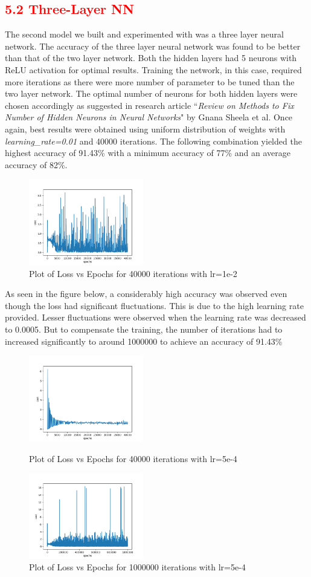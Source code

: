 \documentclass[a4paper,10pt,twocolumn]{article}
\begin{document}
\subsection*{\textcolor{red}{5.2 Three-Layer NN}}
The second model we built and experimented with was a three layer neural network. The accuracy of the three layer neural network was found to be better than that of the two layer network. Both the hidden layers had 5 neurons with ReLU activation for optimal results. Training the network, in this case, required more iterations as there were more number of parameter to be tuned than the two layer network. The optimal number of neurons for both hidden layers were chosen accordingly as suggested in research article ``\emph{Review on Methods to Fix Number of Hidden
Neurons in Neural Networks}" by Gnana Sheela et al. Once again, best results were obtained using uniform distribution of weights with \textit{learning\_rate=0.01} and 40000 iterations. The following combination yielded the highest accuracy of 91.43\% with a minimum accuracy of 77\% and an average accuracy of 82\%.
\begin{figure}[h]
\centering
\includegraphics[scale=1.0, width=5cm]{Fig21.png}
\caption{Plot of Loss vs Epochs for 40000 iterations with lr=1e-2}
\end{figure}
As seen in the figure below, a considerably high accuracy was observed even though the loss had significant fluctuations. This is due to the high learning rate provided. Lesser fluctuations were observed when the learning rate was decreased to 0.0005. But to compensate the training, the number of iterations had to increased significantly to around 1000000 to achieve an accuracy of 91.43\%
\begin{figure}[h]
\centering
\includegraphics[scale=1.0, width=5cm]{Fig22.png}
\caption{Plot of Loss vs Epochs for 40000 iterations with lr=5e-4}
\includegraphics[scale=1.0, width=5cm]{Fig23.png}
\caption{Plot of Loss vs Epochs for 1000000 iterations with lr=5e-4}
\end{figure}
\end{document}
